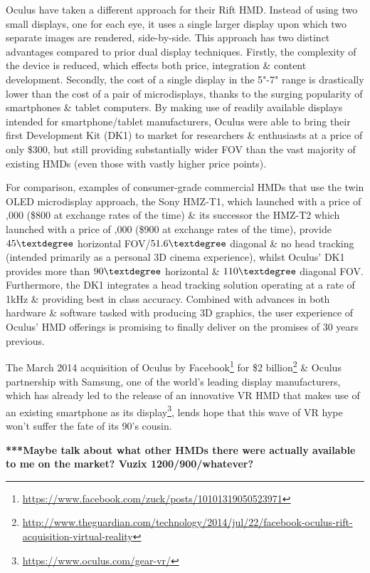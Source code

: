 Oculus have taken a different approach for their Rift HMD. Instead of using two small displays, one for each eye, it uses a single larger display upon which two separate images are rendered, side-by-side. This approach has two distinct advantages compared to prior dual display techniques. Firstly, the complexity of the device is reduced, which effects both price, integration \& content development. Secondly, the cost of a single display in the 5"-7" range is drastically lower than the cost of a pair of microdisplays, thanks to the surging popularity of smartphones \& tablet computers. By making use of readily available displays intended for smartphone/tablet manufacturers, Oculus were able to bring their first Development Kit (DK1) to market for researchers \& enthusiasts at a price of only \$300, but still providing substantially wider FOV than the vast majority of existing HMDs (even those with vastly higher price points).

For comparison, examples of consumer-grade commercial HMDs that use the twin OLED microdisplay approach, the Sony HMZ-T1, which launched with a price of ,000 (\$800 at exchange rates of the time) \& its successor the HMZ-T2 which launched with a price of ,000 (\$900 at exchange rates of the time), provide $45\textdegree$ horizontal FOV/$51.6\textdegree$ diagonal \& no head tracking (intended primarily as a personal 3D cinema experience), whilst Oculus' DK1 provides more than $90\textdegree$ horizontal \& $110\textdegree$ diagonal FOV. Furthermore, the DK1 integrates a head tracking solution operating at a rate of 1kHz \& providing best in class accuracy. Combined with advances in both hardware \& software tasked with producing 3D graphics, the user experience of Oculus' HMD offerings is promising to finally deliver on the promises of 30 years previous.

The March 2014 acquisition of Oculus by Facebook\footnote{\url{https://www.facebook.com/zuck/posts/10101319050523971}} for \$2 billion\footnote{\url{http://www.theguardian.com/technology/2014/jul/22/facebook-oculus-rift-acquisition-virtual-reality}} \& Oculus partnership with Samsung, one of the world's leading display manufacturers, which has already led to the release of an innovative VR HMD that makes use of an existing smartphone as its display\footnote{\url{https://www.oculus.com/gear-vr/}}, lends hope that this wave of VR hype won't suffer the fate of its 90's cousin.

\textbf{***Maybe talk about what other HMDs there were actually available to me on the market? Vuzix 1200/900/whatever?}


